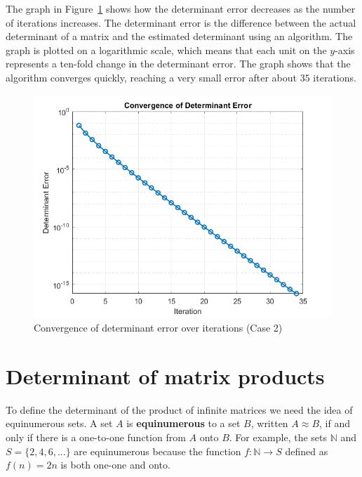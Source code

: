 The graph in Figure~\ref{graph-appdet-02} shows how the determinant error decreases as the number of iterations increases. The determinant error is the difference between the actual determinant of a matrix and the estimated determinant using an algorithm. The graph is plotted on a logarithmic scale, which means that each unit on the $y$-axis represents a ten-fold change in the determinant error. The graph shows that the algorithm converges quickly, reaching a very small error after about $35$ iterations.
\begin{center}
    \begin{figure}[h]
        \centering
        \includegraphics[width=0.8\linewidth]{Figures/det_error_higher_dim.png}
        \caption{Convergence of determinant error  over iterations (Case 2)}
        \label{graph-appdet-02}
    \end{figure}
\end{center}





\medskip

\section{Determinant of matrix products}

To define the determinant of the product of infinite matrices we need the idea of equinumerous sets. A set $A$ is \textbf{equinumerous} to a set $B$, written $A \approx B$, if and only if there is a one-to-one function from $A$ onto $B$. For example, the sets $\mathbb{N}$ and $S=\{2, 4, 6, ...\}$ are equinumerous because the function $f: \mathbb{N}\to S$ defined as $f(n) = 2n$ is both one-one and onto.


